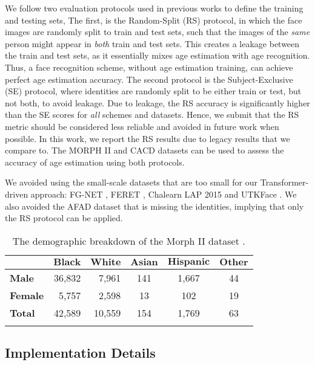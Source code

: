 \documentclass[10pt,journal]{IEEEtran}\usepackage{amsfonts}
\begin{document}
We follow two evaluation protocols used in previous works
\cite{Mean-Variance, 9145576} to define the training and testing
sets, The first, is the Random-Split (RS) protocol, in which the face images
are randomly split to train and test sets, such that the images of the
\textit{same} person might appear in \textit{both} train and test sets. This
creates a leakage between the train and test sets, as it essentially mixes age
estimation with age recognition. Thus, a face recognition scheme, without age
estimation training, can achieve perfect age estimation accuracy. The second
protocol is the Subject-Exclusive (SE) protocol, where identities are randomly
split to be either train or test, but not both, to avoid leakage. Due to
leakage, the RS accuracy is significantly higher than the SE scores for
\textit{all} schemes and datasets. Hence, we submit that the RS metric should
be considered less reliable and avoided in future work when possible. In this
work, we report the RS results due to legacy results that we compare to. The
MORPH II and CACD datasets can be used to assess the accuracy of age
estimation using both protocols.

We avoided using the small-scale datasets that are too small for our
Transformer-driven approach: FG-NET \cite{cootes2008fg}, FERET
\cite{PHILLIPS1998295}, Chalearn LAP 2015 \cite{agustsson2017appareal} and
UTKFace \cite{zhifei2017cvpr}. We also avoided the AFAD dataset \cite{7780901}
that is missing the identities, implying that only the RS protocol can be
applied.\begin{table}[tbh]
\caption{The demographic breakdown of the Morph II dataset \cite{1613043}.}\label{table:demographic_comparison}
\centering
\renewcommand{\arraystretch}{1.3}
\begin{tabular}
[c]{@{}lrrccc}\toprule & $\mathbf{Black}$ & $\mathbf{White}$ & $\mathbf{Asian}$ &
$\mathbf{Hispanic}$ & $\mathbf{Other}$\\
\midrule \textbf{Male} & 36,832 & 7,961 & 141 & 1,667 & 44\\
\textbf{Female} & 5,757 & 2,598 & 13 & 102 & 19\\
\textbf{Total} & 42,589 & 10,559 & 154 & 1,769 & 63\\
\bottomrule &  &  &  &  &
\end{tabular}
\end{table}

\subsection{Implementation Details}
\end{document}

